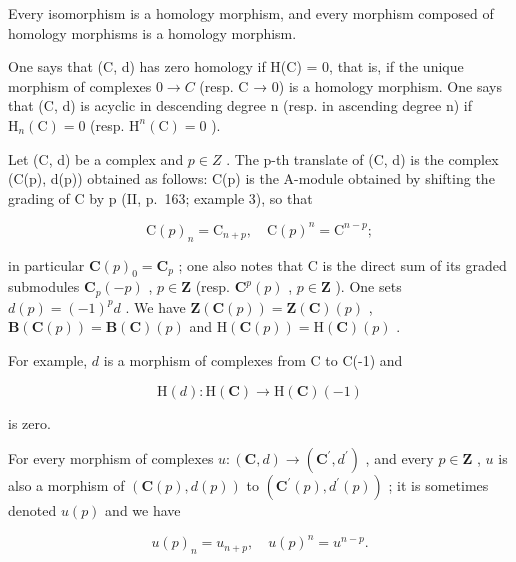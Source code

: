 Every isomorphism is a homology morphism, and every morphism composed of homology morphisms is a homology morphism.

One says that (C, d) has zero homology if H(C) = 0, that is, if the unique morphism of complexes \(0 \rightarrow C\) (resp. C → 0) is a homology morphism. One says that (C, d) is acyclic in descending degree n (resp. in ascending degree n) if \(\mathrm{H}_{n}(\mathrm{C}) = 0\) (resp. \(\mathrm{H}^{n}(\mathrm{C}) = 0\) ).

Let (C, d) be a complex and \(p \in Z\) . The p-th translate of (C, d) is the complex (C(p), d(p)) obtained as follows: C(p) is the A-module obtained by shifting the grading of C by p (II, p.~163; example 3), so that

\[
\mathrm{C} (p) _ {n} = \mathrm{C} _ {n + p}, \quad \mathrm{C} (p) ^ {n} = \mathrm{C} ^ {n - p};
\]

in particular \(\mathbf{C}(p)_{0} = \mathbf{C}_{p}\) ; one also notes that C is the direct sum of its graded submodules \(\mathbf{C}_{p}(-p)\) , \(p \in \mathbf{Z}\) (resp. \(\mathbf{C}^{p}(p)\) , \(p \in \mathbf{Z}\) ). One sets \(d(p) = (-1)^{p} d\) . We have \(\mathbf{Z}(\mathbf{C}(p)) = \mathbf{Z}(\mathbf{C})(p)\) , \(\mathbf{B}(\mathbf{C}(p)) = \mathbf{B}(\mathbf{C})(p)\) and \(\mathrm{H}(\mathbf{C}(p)) = \mathrm{H}(\mathbf{C})(p)\) .

For example, \(d\) is a morphism of complexes from C to C(-1) and

\[
\mathrm{H} (d): \mathrm{H} (\mathbf {C}) \to \mathrm{H} (\mathbf {C}) (- 1)
\]

is zero.

For every morphism of complexes \(u:(\mathbf{C},d)\to(\mathbf{C}^{\prime},d^{\prime})\) , and every \(p\in\mathbf{Z}\) , \(u\) is also a morphism of \((\mathbf{C}(p),d(p))\) to \((\mathbf{C}^{\prime}(p),d^{\prime}(p))\) ; it is sometimes denoted \(u(p)\) and we have

\[
u (p) _ {n} = u _ {n + p}, \quad u (p) ^ {n} = u ^ {n - p}.
\]
\relax{}
